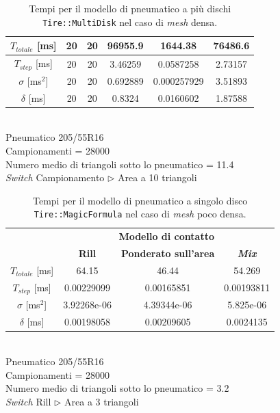 \begin{table}
\begin{tabular}{c|c|c|c|c|c|}
		\multicolumn{1}{|c|}{$T_{totale}$ [ms]} & 20 & 20 & 96955.9 & 1644.38 & 76486.6 \\ 
		\hline 
		\multicolumn{1}{|c|}{$T_{step}$ [ms]} & 20 & 20 & 3.46259 & 0.0587258 & 2.73157 \\ 
		\hline 
		\multicolumn{1}{|c|}{$\sigma$ [ms$^2$]} & 20 & 20 & 0.692889 & 0.000257929 & 3.51893 \\ 
		\hline 
		\multicolumn{1}{|c|}{$\delta$ [ms]} & 20 & 20 & 0.8324 & 0.0160602 & 1.87588 \\ 
		\hline
	\end{tabular}
	\\[0.5cm]
	Pneumatico 205/55R16\\
	Campionamenti = 28000\\
	Numero medio di triangoli sotto lo pneumatico = 11.4\\
	\textit{Switch} Campionamento $\triangleright$ Area a 10 triangoli
	\caption{Tempi per il modello di pneumatico a più dischi \texttt{Tire::MultiDisk} nel caso di \textit{mesh} densa.}
	\label{MDcordolo}
\end{table}
%
\clearpage
%
\begin{table}
	\centering
	\begin{tabular}{c|c|c|c|}
		\cline{2-4} 
		& \multicolumn{3}{c|}{\textbf{Modello di contatto}} \\
		\cline{2-4} 
		& \textbf{Rill} & \textbf{Ponderato sull'area} & \textbf{\textit{Mix}} \\ 
		\hline 
		\multicolumn{1}{|c|}{$T_{totale}$ [ms]} & 64.15 & 46.44 & 54.269 \\ 
		\hline 
		\multicolumn{1}{|c|}{$T_{step}$ [ms]} & 0.00229099 & 0.00165851 & 0.00193811 \\ 
		\hline 
		\multicolumn{1}{|c|}{$\sigma$ [ms$^2$]} & 3.92268e-06 & 4.39344e-06 & 5.825e-06 \\ 
		\hline 
		\multicolumn{1}{|c|}{$\delta$ [ms]} & 0.00198058 & 0.00209605 & 0.0024135 \\ 
		\hline 
	\end{tabular}
	\\[0.5cm]
	Pneumatico 205/55R16\\
	Campionamenti = 28000\\
	Numero medio di triangoli sotto lo pneumatico = 3.2\\
	\textit{Switch} Rill $\triangleright$ Area a 3 triangoli
	\caption{Tempi per il modello di pneumatico a singolo disco \texttt{Tire::MagicFormula} nel caso di \textit{mesh} poco densa.}
	\label{MFpiano}
\end{table}
